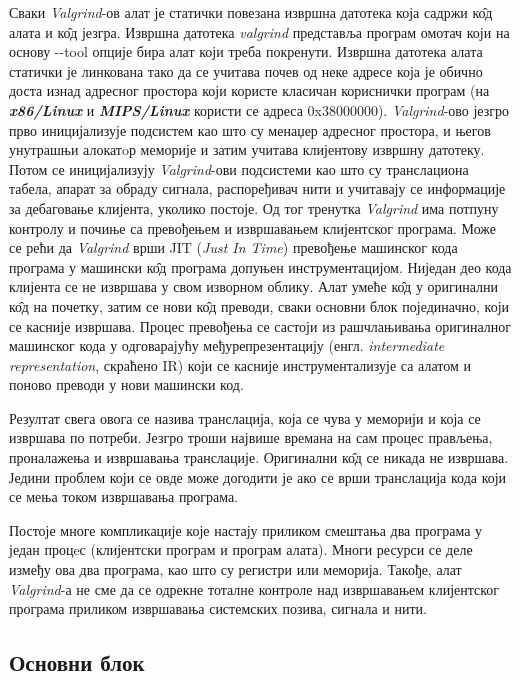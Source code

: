 \documentclass[12pt,oneside]{memoir}
\begin{document}
\indent Сваки \textit{Valgrind}-ов алат је статички повезана извршна датотека која садржи к\^{о}д алата и к\^{о}д језгра. Извршна датотека \textit{valgrind} представља програм омотач који на основу -\--tool опције бира алат који треба покренути. Извршна датотека алата статички је линкована тако да се учитава почев од неке адресе која је обично доста изнад адресног простора који користе класичан кориснички програм (на \textbf{\textit{x86/Linux}} и \textbf{\textit{MIPS/Linux}} користи се адреса 0x38000000). \textit{Valgrind}-ово језгро прво иницијализује подсистем као што су менаџер адресног простора, и његов унутрашњи алокатoр меморије и затим учитава клијентову извршну датотеку. Потом се иницијализују \textit{Valgrind}-ови подсистеми као што су транслациона табела, апарат за обраду сигнала, распоређивач нити и учитавају се информације за дебаговање клијента, уколико постоје. Од тог тренутка \textit{Valgrind} има потпуну контролу и почиње са превођењем и извршавањем клијентског програма. Може се рећи да \textit{Valgrind} врши JIT (\textit{Just In Time}) превођење машинског кода програма у машински к\^{о}д програма допуњен инструментацијом. Ниједан део кода клијента се не извршава у свом изворном облику. Алат умеће к\^{о}д у оригинални к\^{о}д на почетку, затим се нови к\^{о}д преводи, сваки основни блок појединачно, који се касније извршава. Процес превођења се састоји из рашчлањивања оригиналног машинског кода у одговарајућу међурепрезентацију (енгл. \textit{intermediate representation}, скраћено IR) који се касније инструментализује са алатом и поново преводи у нови машински код. 

\indent Резултат свега овога се назива транслација, која се чува у меморији и која се извршава по потреби. Језгро троши највише времана на сам процес прављења, проналажења и извршавања транслације. Оригинални к\^{о}д се никада не извршава. Једини проблем који се овде може догодити је ако се врши транслација кода који се мења током извршавања програма.

\indent Постоје многе компликације које настају приликом смештања два програма у један процeс (клијентски програм и програм алата). Многи ресурси се деле између ова два програма, као што су регистри или меморија. Такође, алат \textit{Valgrind}-а не сме да се одрекне тоталне контроле над извршавањем клијентског програма приликом извршавања системских позива, сигнала и нити.

\subsection{Основни блок}
\end{document}
